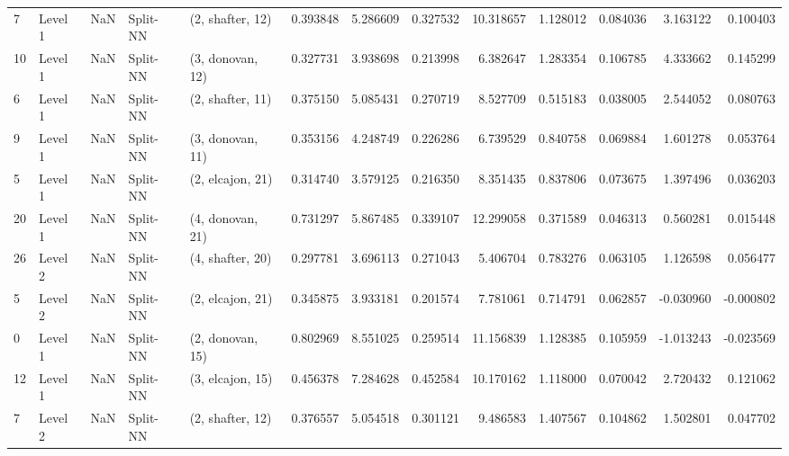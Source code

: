 \begin{tabular}{llrllrrrrrrrr}
7  &   Level 1 &    NaN &       Split-NN &  (2, shafter, 12) &   0.393848 &   5.286609 &  0.327532 &  10.318657 &             1.128012 &               0.084036 &            3.163122 &              0.100403 \\
10 &   Level 1 &    NaN &       Split-NN &  (3, donovan, 12) &   0.327731 &   3.938698 &  0.213998 &   6.382647 &             1.283354 &               0.106785 &            4.333662 &              0.145299 \\
6  &   Level 1 &    NaN &       Split-NN &  (2, shafter, 11) &   0.375150 &   5.085431 &  0.270719 &   8.527709 &             0.515183 &               0.038005 &            2.544052 &              0.080763 \\
9  &   Level 1 &    NaN &       Split-NN &  (3, donovan, 11) &   0.353156 &   4.248749 &  0.226286 &   6.739529 &             0.840758 &               0.069884 &            1.601278 &              0.053764 \\
5  &   Level 1 &    NaN &       Split-NN &  (2, elcajon, 21) &   0.314740 &   3.579125 &  0.216350 &   8.351435 &             0.837806 &               0.073675 &            1.397496 &              0.036203 \\
20 &   Level 1 &    NaN &       Split-NN &  (4, donovan, 21) &   0.731297 &   5.867485 &  0.339107 &  12.299058 &             0.371589 &               0.046313 &            0.560281 &              0.015448 \\
26 &   Level 2 &    NaN &       Split-NN &  (4, shafter, 20) &   0.297781 &   3.696113 &  0.271043 &   5.406704 &             0.783276 &               0.063105 &            1.126598 &              0.056477 \\
5  &   Level 2 &    NaN &       Split-NN &  (2, elcajon, 21) &   0.345875 &   3.933181 &  0.201574 &   7.781061 &             0.714791 &               0.062857 &           -0.030960 &             -0.000802 \\
0  &   Level 1 &    NaN &       Split-NN &  (2, donovan, 15) &   0.802969 &   8.551025 &  0.259514 &  11.156839 &             1.128385 &               0.105959 &           -1.013243 &             -0.023569 \\
12 &   Level 1 &    NaN &       Split-NN &  (3, elcajon, 15) &   0.456378 &   7.284628 &  0.452584 &  10.170162 &             1.118000 &               0.070042 &            2.720432 &              0.121062 \\
7  &   Level 2 &    NaN &       Split-NN &  (2, shafter, 12) &   0.376557 &   5.054518 &  0.301121 &   9.486583 &             1.407567 &               0.104862 &            1.502801 &              0.047702 \\

\end{tabular}

